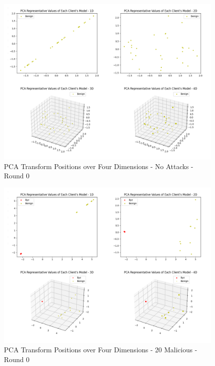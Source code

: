 \begin{figure}[htbp]
	\centering
    \includegraphics[scale=0.3]{my_agg/graphs/0mal_dims.png}
	\caption{PCA Transform Positions over Four Dimensions - No Attacks - Round 0}
	\label{fig:0mal_dims}
\end{figure}

\begin{figure}[htbp]
	\centering
    \includegraphics[scale=0.3]{my_agg/graphs/20mal_dims.png}
	\caption{PCA Transform Positions over Four Dimensions - 20 Malicious - Round 0}
	\label{fig:20mal_dims}
\end{figure}

